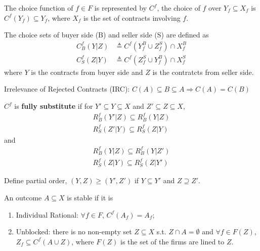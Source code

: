 \documentclass[11pt]{elegantbook}
\begin{document}
The choice function of $f\in F$ is represented by $C^f$, the choice of $f$ over $Y_f\subseteq X_f$ is $C^f(Y_f)\subseteq Y_f$, where $X_f$ is the set of contracts involving $f$.

The choice sets of buyer side (B) and seller side (S) are defined as
\begin{equation}
    \begin{aligned}
        C_B^f(Y|Z)&\triangleq C^f(Y_f^B\cup Z_f^S)\cap X_f^B\\
        C_S^f(Z|Y)&\triangleq C^f(Z_f^S\cup Y_f^B)\cap X_f^S
    \end{aligned}
    \nonumber
\end{equation}
where $Y$ is the contracts from buyer side and $Z$ is the contratcts from seller side.


\begin{definition}
    \normalfont
    Irrelevance of Rejected Contracts (IRC): $C(A)\subseteq B\subseteq A \Rightarrow C(A)=C(B)$
\end{definition}

\begin{definition}
    \normalfont
    $C^f$ is \textbf{fully substitute} if for $Y'\subseteq Y\subseteq X$ and $Z'\subseteq Z\subseteq X$,
    \begin{equation}
        \begin{aligned}
            R_B^f(Y'|Z)\subseteq R_B^f(Y|Z)\\
            R_S^f(Z'|Y)\subseteq R_S^f(Z|Y)
        \end{aligned}
        \nonumber
    \end{equation}
    and
    \begin{equation}
        \begin{aligned}
            R_B^f(Y|Z)\subseteq R_B^f(Y|Z')\\
            R_S^f(Z|Y)\subseteq R_S^f(Z|Y')
        \end{aligned}
        \nonumber
    \end{equation}
\end{definition}
Define partial order, $(Y,Z)\geq (Y',Z')$ if $Y\subseteq Y'$ and $Z\supseteq  Z'$.


\begin{definition}
    \normalfont
    An outcome $A\subseteq X$ is stable if it is
    \begin{enumerate}
        \item Individual Rational: $\forall f\in F$, $C^f (A_f)=A_f$;
        \item Unblocked: there is no non-empty set $Z\subseteq X$ s.t. $Z\cap A=\emptyset$ and $\forall f\in F(Z)$, $Z_f\subseteq C^f(A\cup Z)$, where $F(Z)$ is the set of the firms are lined to $Z$.
    \end{enumerate}
\end{definition}
\end{document}

